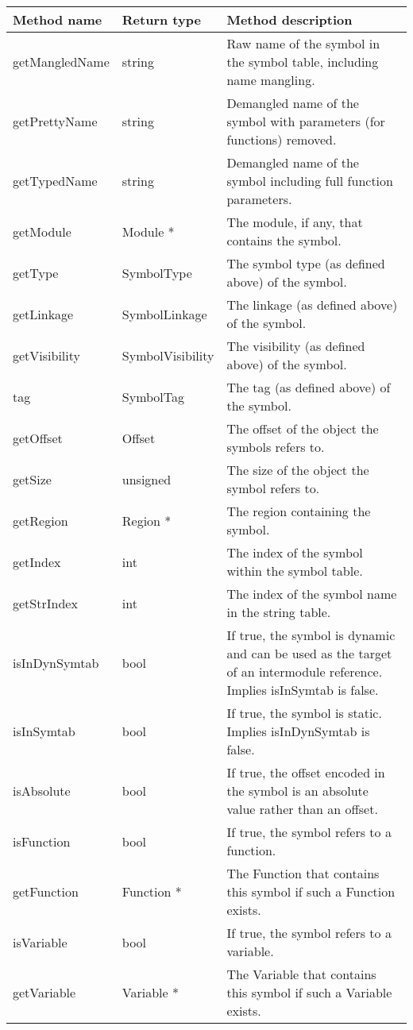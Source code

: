 \begin{center}
\begin{center}
\begin{tabular}{p{1.25in}p{1in}p{3.25in}}
	Method name & Return type & Method description \\
	\hline
	getMangledName & string & Raw name of the symbol in the symbol table, including name mangling. \\
	getPrettyName & string & Demangled name of the symbol with parameters (for functions) removed. \\
	getTypedName & string & Demangled name of the symbol including full function parameters. \\
	getModule & Module * & The module, if any, that contains the symbol. \\
	getType & SymbolType & The symbol type (as defined above) of the symbol. \\
	getLinkage & SymbolLinkage & The linkage (as defined above) of the symbol. \\
	getVisibility & SymbolVisibility & The visibility (as defined above) of the symbol. \\
	tag & SymbolTag & The tag (as defined above) of the symbol. \\
	getOffset & Offset & The offset of the object the symbols refers to. \\
	getSize & unsigned & The size of the object the symbol refers to. \\
	getRegion & Region * & The region containing the symbol. \\
	getIndex & int & The index of the symbol within the symbol table. \\
	getStrIndex & int & The index of the symbol name in the string table. \\
	isInDynSymtab & bool & If true, the symbol is dynamic and can be used as the target of an intermodule reference. Implies isInSymtab is false.  \\
	isInSymtab & bool & If true, the symbol is static. Implies isInDynSymtab is false. \\
	isAbsolute & bool & If true, the offset encoded in the symbol is an absolute value rather than an offset. \\
	isFunction & bool & If true, the symbol refers to a function. \\
	getFunction & Function * & The Function that contains this symbol if such a Function exists. \\
	isVariable & bool & If true, the symbol refers to a variable. \\
	getVariable & Variable * & The Variable that contains this symbol if such a Variable exists. \\

\end{tabular}
\end{center}
\end{center}
